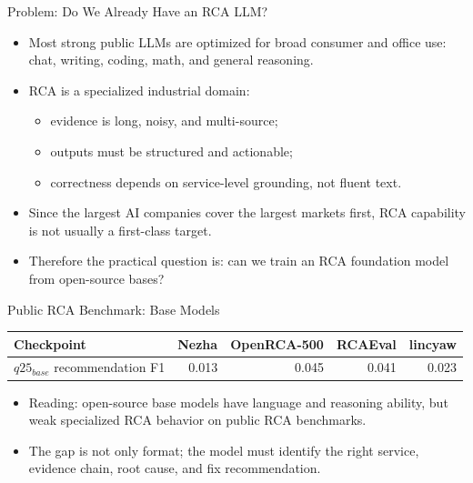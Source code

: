 \begin{frame}{Problem: Do We Already Have an RCA LLM?}
  \begin{itemize}
    \item Most strong public LLMs are optimized for broad consumer and office use:
      chat, writing, coding, math, and general reasoning.
    \item RCA is a specialized industrial domain:
      \begin{itemize}
        \item evidence is long, noisy, and multi-source;
        \item outputs must be structured and actionable;
        \item correctness depends on service-level grounding, not fluent text.
      \end{itemize}
    \item Since the largest AI companies cover the largest markets first, RCA
      capability is not usually a first-class target.
    \item Therefore the practical question is: can we train an RCA foundation
      model from open-source bases?
  \end{itemize}
\end{frame}

\begin{frame}{Public RCA Benchmark: Base Models}
  \tiny
  \begin{table}
    \begin{tabular}{lrrrr}
      \toprule
      Checkpoint & Nezha & OpenRCA-500 & RCAEval & lincyaw \\
      \midrule
      $q25_{base}$ recommendation F1 & 0.013 & 0.045 & 0.041 & 0.023 \\
      \bottomrule
    \end{tabular}
  \end{table}
  \normalsize
  \begin{itemize}
    \item Reading: open-source base models have language and reasoning ability,
      but weak specialized RCA behavior on public RCA benchmarks.
    \item The gap is not only format; the model must identify the right service,
      evidence chain, root cause, and fix recommendation.
  \end{itemize}
\end{frame}

